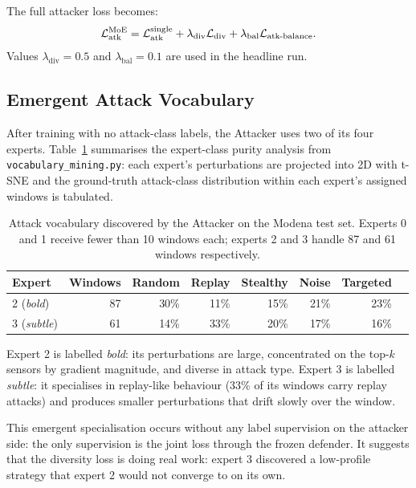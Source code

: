 The full attacker loss becomes:
\begin{equation}
  \mathcal{L}_\text{atk}^\text{MoE} =
    \mathcal{L}_\text{atk}^\text{single}
    + \lambda_\text{div}\mathcal{L}_\text{div}
    + \lambda_\text{bal}\mathcal{L}_\text{atk\text{-}balance}.
\end{equation}
Values $\lambda_\text{div} = 0.5$ and $\lambda_\text{bal} = 0.1$
are used in the headline run.

\subsection{Emergent Attack Vocabulary}

After training with no attack-class labels, the Attacker \moe{} uses
two of its four experts. Table~\ref{tab:vocab} summarises the
expert-class purity analysis from \texttt{vocabulary\_mining.py}: each
expert's perturbations are projected into 2D with t-SNE and
the ground-truth attack-class distribution within each expert's
assigned windows is tabulated.

\begin{table}[htbp]
  \centering
  \caption{Attack vocabulary discovered by the Attacker \moe{} on
  the Modena test set. Experts 0 and 1 receive fewer than 10
  windows each; experts 2 and 3 handle 87 and 61 windows
  respectively.}
  \label{tab:vocab}
  \begin{tabular}{lrrrrrrr}
    \toprule
    Expert & Windows & Random & Replay & Stealthy & Noise & Targeted \\
    \midrule
    2 (\emph{bold})   & 87 & 30\% & 11\% & 15\% & 21\% & 23\% \\
    3 (\emph{subtle}) & 61 & 14\% & 33\% & 20\% & 17\% & 16\% \\
    \bottomrule
  \end{tabular}
\end{table}

Expert 2 is labelled \emph{bold}: its perturbations are large,
concentrated on the top-$k$ sensors by gradient magnitude, and
diverse in attack type. Expert 3 is labelled \emph{subtle}: it
specialises in replay-like behaviour (33\% of its windows carry
replay attacks) and produces smaller perturbations that drift
slowly over the window.

This emergent specialisation occurs without any label supervision
on the attacker side: the only supervision is the joint loss through
the frozen defender. It suggests that the diversity loss is doing
real work: expert 3 discovered a low-profile strategy that expert 2
would not converge to on its own.

